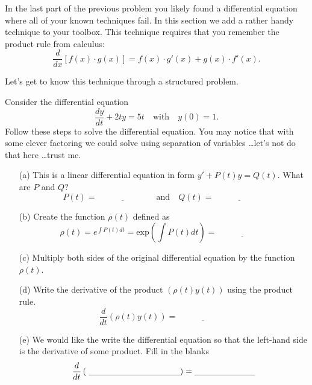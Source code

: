 In the last part of the previous problem you likely found a differential equation where
all of your known techniques fail.  In this section we add a rather handy technique to
your toolbox.  This technique requires that you remember the product rule from calculus:
\[ \frac{d}{dx}\left[ f(x) \cdot g(x) \right] = f(x) \cdot g'(x) + g(x) \cdot f'(x). \]

Let's get to know this technique through a structured problem.
\begin{problem}
    Consider the differential equation 
    \[ \frac{dy}{dt} + 2ty = 5t \quad \text{with} \quad y(0) = 1. \]
    Follow these steps to solve the differential equation.  You may notice that with some
    clever factoring we could solve using separation of variables \ldots let's not do that
    here \ldots trust me.
    \begin{enumerate}
        \item[(a)] This is a linear differential equation in form $y' + P(t) y = Q(t)$.
            What are $P$ and $Q$?
            \[ P(t) = \underline{\hspace{1in}} \quad \text{and} \quad Q(t) =
            \underline{\hspace{1in}} \]
        \item[(b)] Create the function $\rho(t)$ defined as
            \[ \rho(t) = e^{\int P(t) dt} = \text{exp}\left( \int P(t) dt \right) =
            \underline{\hspace{1in}} \]
        \item[(c)] Multiply both sides of the original differential equation by the
            function $\rho(t)$.
            \solution{
                \[ e^{t^2} y' + 2t e^{t^2} y = 5t e^{t^2} \]
            }
        \item[(d)] Write the derivative of the product $\left( \rho(t) y(t) \right)$ using the product
            rule.
            \[ \frac{d}{dt} \left( \rho(t) y(t) \right) = \underline{\hspace{1in}} \]
        \item[(e)] We would like the write the differential equation so that the left-hand
            side is the derivative of some product.  Fill in the blanks
            \[ \frac{d}{dt}\left( \,\,\underline{\hspace{1.5in}}\right) =
        \underline{\hspace{1in}} \]

\end{enumerate}
\end{problem}
